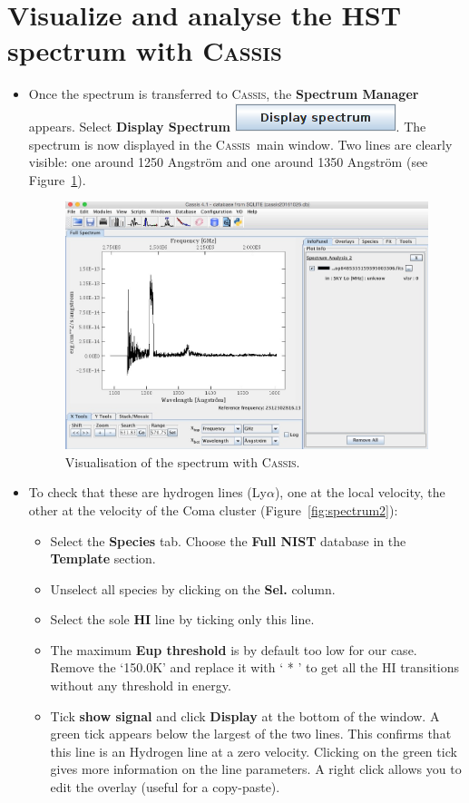\documentclass [a4paper, 12pt]{article}
\newcommand{\cassis}{{\textsc{Cassis}}}
\begin{document}
\section{Visualize and analyse the HST spectrum with \cassis}

\begin{itemize}
\item Once the spectrum is transferred to \cassis, the \textbf{Spectrum 
Manager} appears. Select \textbf{Display Spectrum} \includegraphics[width=0.2  
\textwidth]{../images/cassis_button_display-spectrum.png}. The 
spectrum is now displayed in the \cassis\ main window. Two lines are clearly 
visible: one around 1250 Angstr\"om and one around 1350 Angstr\"om (see 
Figure~\ref{fig:spectrum}). 


\begin{figure}[H]
\center
\includegraphics[width=0.6  \textwidth]{../images/cassis_display_spectrum-1.jpg}
\caption{Visualisation of the spectrum with \cassis.}
\label{fig:spectrum}
\end{figure}
\item To check that these are hydrogen lines (Ly$\alpha$), one at the local 
velocity, the other at the velocity of the Coma cluster 
(Figure~\ref{fig:spectrum2}):
\begin{itemize}
    \item Select the \textbf{Species} tab. Choose the \textbf{Full NIST} 
    database in the \textbf{Template} section.
    \item Unselect all species by clicking on the \textbf{Sel.} column.
    \item Select the sole \textbf{HI} line by ticking only this line.
    \item The maximum \textbf{Eup threshold} is by default too low for our 
    case. Remove the `150.0K' and replace it with ` *  ' to get all the HI 
    transitions without any threshold in energy.
    \item Tick \textbf{show signal} and click \textbf{Display} at the bottom of 
    the window. A green tick appears below the largest of the two lines. This 
    confirms that this line is an Hydrogen line at a zero velocity. Clicking on 
    the green tick gives more information on the line parameters. A right click 
    allows you to edit the overlay (useful for a copy-paste).
\end{itemize}


\end{itemize}
\end{document}
